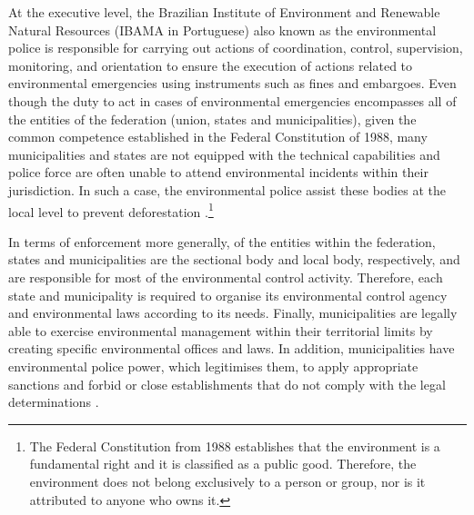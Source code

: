 At the executive level, the Brazilian Institute of Environment and Renewable Natural Resources (IBAMA in Portuguese) also known as the environmental police \citep{hargrave_kis-katos_2012} is responsible for carrying out actions of coordination, control, supervision, monitoring, and orientation to ensure the execution of actions related to environmental emergencies using instruments such as fines and embargoes. Even though the duty to act in cases of environmental emergencies encompasses all of the entities of the federation (union, states and municipalities), given the common competence established in the Federal Constitution of 1988, many municipalities and states are not equipped with the technical capabilities and police force are often unable to attend environmental incidents within their jurisdiction. In such a case, the environmental police assist these bodies at the local level to prevent deforestation \citep{SISNAMA, MENDESJUSBRASIL}.\footnote{The Federal Constitution from 1988 establishes that the environment is a fundamental right and it is classified as a public good. Therefore, the environment does not belong exclusively to a person or group, nor is it attributed to anyone who owns it.}

In terms of enforcement more generally, of the entities within the federation, states and municipalities are the sectional body and local body, respectively, and are responsible for most of the environmental control activity. Therefore, each state and municipality is required to organise its environmental control agency and environmental laws according to its needs. Finally, municipalities are legally able to exercise environmental management within their territorial limits by creating specific environmental offices and laws. In addition, municipalities have environmental police power, which legitimises them, to apply appropriate sanctions and forbid or close establishments that do not comply with the legal determinations \citep{MENDESJUSBRASIL}.

